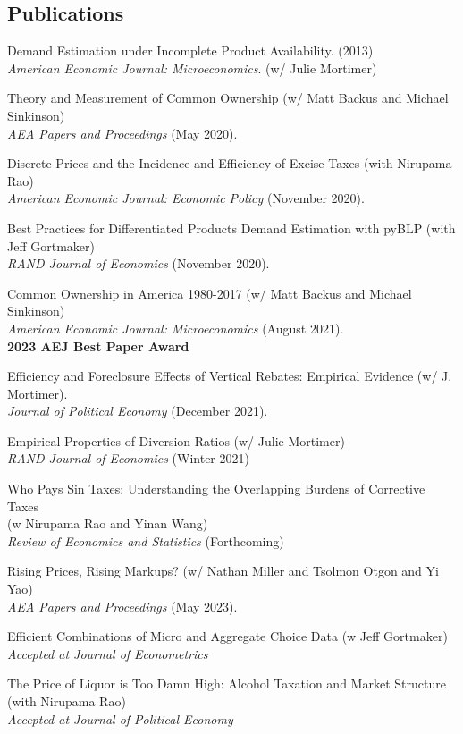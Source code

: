 \documentclass[letterpaper]{article}
\renewenvironment{itemize}{
  \begin{list}{}{
    \setlength{\leftmargin}{1.5em}
  }
}{
  \end{list}
}
\begin{document}
\subsection*{Publications}
\begin{itemize}
\item Demand Estimation under Incomplete Product Availability. (2013)\\
 \textit{American Economic Journal: Microeconomics}. (w/ Julie Mortimer)
\item Theory and Measurement of Common Ownership (w/ Matt Backus and Michael Sinkinson) \\\textit{AEA Papers and Proceedings} (May 2020).
\item Discrete Prices and the Incidence and Efficiency of Excise Taxes  (with Nirupama Rao)  \\\textit{American Economic Journal: Economic Policy} (November 2020). 
\item Best Practices for Differentiated Products Demand Estimation with pyBLP (with Jeff Gortmaker) \\\textit{RAND Journal of Economics} (November 2020).
\item Common Ownership in America 1980-2017 (w/ Matt Backus and Michael Sinkinson) \\\textit{American Economic Journal: Microeconomics} (August 2021).\\
\textbf{2023 AEJ Best Paper Award}\\
\item Efficiency and Foreclosure Effects of Vertical Rebates: Empirical Evidence (w/ J. Mortimer). \\\textit{Journal of Political Economy} (December 2021).
\item Empirical Properties of Diversion Ratios (w/ Julie Mortimer)\\\textit{RAND Journal of Economics} (Winter 2021)
\item Who Pays Sin Taxes: Understanding the Overlapping Burdens of Corrective Taxes\\
 (w Nirupama Rao and Yinan Wang) \\
 \textit{Review of Economics and Statistics} (Forthcoming)
 \item Rising Prices, Rising Markups? (w/ Nathan Miller and Tsolmon Otgon and Yi Yao)\\ 
 \textit{AEA Papers and Proceedings} (May 2023).
 \item Efficient Combinations of Micro and Aggregate Choice Data (w Jeff Gortmaker)  \\\textit{Accepted at Journal of Econometrics}
\item The Price of Liquor is Too Damn High: Alcohol Taxation and Market Structure (with Nirupama Rao)  \\\textit{Accepted at Journal of Political Economy} 
\end{itemize}
\end{document}
